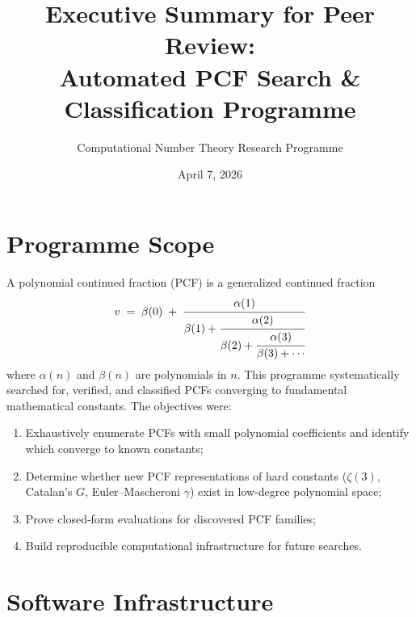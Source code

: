 \documentclass[11pt,a4paper]{article}
\title{Executive Summary for Peer Review:\\
Automated PCF Search \& Classification Programme}
\author{Computational Number Theory Research Programme}
\date{April 7, 2026}
\begin{document}
\maketitle

\section{Programme Scope}

A polynomial continued fraction (PCF) is a generalized continued fraction
\[
v \;=\; \beta(0) \;+\; \cfrac{\alpha(1)}{\beta(1) + \cfrac{\alpha(2)}{\beta(2) + \cfrac{\alpha(3)}{\beta(3) + \cdots}}}
\]
where $\alpha(n)$ and $\beta(n)$ are polynomials in $n$.
This programme systematically searched for, verified, and classified PCFs
converging to fundamental mathematical constants.
The objectives were:
\begin{enumerate}[leftmargin=2em]
\item Exhaustively enumerate PCFs with small polynomial coefficients and
      identify which converge to known constants;
\item Determine whether new PCF representations of hard constants
      ($\zeta(3)$, Catalan's $G$, Euler--Mascheroni $\gamma$) exist in
      low-degree polynomial space;
\item Prove closed-form evaluations for discovered PCF families;
\item Build reproducible computational infrastructure for future searches.
\end{enumerate}

\section{Software Infrastructure}
\end{document}
